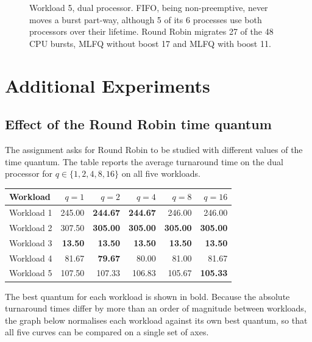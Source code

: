 \documentclass[11pt,a4paper]{article}
\begin{document}
\begin{figure}[H]
\par
\caption{Workload 5, dual processor. FIFO, being non-preemptive, never moves a burst part-way, although 5 of its 6 processes use both processors over their lifetime. Round Robin migrates 27 of the 48 CPU bursts, MLFQ without boost 17 and MLFQ with boost 11.}
\label{fig:gantt-dual-5}
\end{figure}
\section{Additional Experiments}

\subsection{Effect of the Round Robin time quantum}

The assignment asks for Round Robin to be studied with different values of the time
quantum. The table reports the average turnaround time on the dual processor for
$q \in \{1,2,4,8,16\}$ on all five workloads.

\begin{center}\small
\begin{tabular}{lrrrrr}
\toprule
\textbf{Workload} & $q=1$ & $q=2$ & $q=4$ & $q=8$ & $q=16$ \\
\midrule
Workload 1 & 245.00 & \textbf{244.67} & \textbf{244.67} & 246.00 & 246.00 \\
Workload 2 & 307.50 & \textbf{305.00} & \textbf{305.00} & \textbf{305.00} & \textbf{305.00} \\
Workload 3 & \textbf{13.50} & \textbf{13.50} & \textbf{13.50} & \textbf{13.50} & \textbf{13.50} \\
Workload 4 & 81.67 & \textbf{79.67} & 80.00 & 81.00 & 81.67 \\
Workload 5 & 107.50 & 107.33 & 106.83 & 105.67 & \textbf{105.33} \\
\bottomrule
\end{tabular}
\end{center}
\noindent The best quantum for each workload is shown in bold. Because the absolute
turnaround times differ by more than an order of magnitude between workloads, the graph
below normalises each workload against its own best quantum, so that all five curves can
be compared on a single set of axes.
\end{document}

